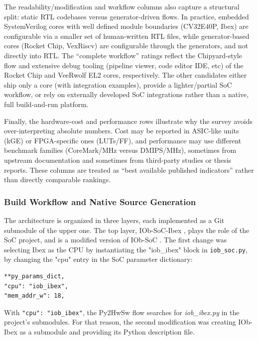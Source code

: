The readability/modification and workflow columns also capture a structural split: static \ac{RTL} codebases versus generator-driven flows. In practice, embedded SystemVerilog cores with well defined module boundaries (CV32E40P, Ibex) are configurable via a smaller set of human-written \ac{RTL} files, while generator-based cores (Rocket Chip, VexRiscv) are configurable through the generators, and not directly into \ac{RTL}. The “complete workflow” ratings reflect the Chipyard-style  flow and extensive debug tooling (pipeline viewer, code editor IDE, etc) of the Rocket Chip and VeeRwolf EL2 cores, respectively. The other candidates either ship only a core (with integration examples), provide a lighter/partial SoC workflow, or rely on externally developed SoC integrations rather than a native, full build-and-run platform.

Finally, the hardware-cost and performance rows illustrate why the survey avoids over-interpreting absolute numbers. Cost may be reported in ASIC-like units (kGE) or FPGA-specific ones (LUTs/FF), and performance may use different benchmark families (CoreMark/MHz versus DMIPS/MHz), sometimes from upstream documentation and sometimes from third-party studies or thesis reports. These columns are treated as “best available published indicators” rather than directly comparable rankings.





\subsubsection{Build Workflow and Native Source Generation}
\label{chap5:ibex_buildflow}

 The architecture is organized in three layers, each implemented as a Git submodule of the upper one. The top layer, IOb-SoC-Ibex \cite{iob-soc-ibex}, plays the role of the \ac{SoC} project, and is a modified version of IOb-SoC \cite{iob-soc}. The first change was selecting Ibex as the \ac{CPU} by instantiating the "iob\_ibex" block in \texttt{iob\_soc.py}, by changing the "cpu" entry in the \ac{SoC} parameter dictionary:
\begin{lstlisting}[language=matlabfloz,caption={Portion of the new iob\_soc.py}]
**py_params_dict,
"cpu": "iob_ibex",
"mem_addr_w": 18,
\end{lstlisting}

 With \texttt{"cpu": "iob\_ibex"}, the Py2HwSw flow searches for \textit{iob\_ibex.py} in the project's submodules. For that reason, the second modification was creating IOb-Ibex \cite{iob-ibex} as a submodule and providing its Python description file.

